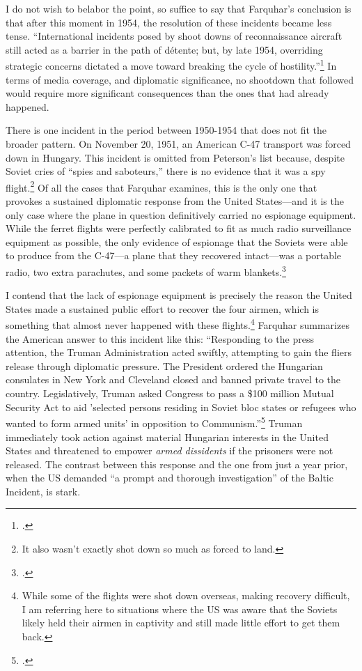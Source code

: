 \documentclass{report}
\begin{document}
\begin{refsegment}
I do not wish to belabor the point, so suffice to say that Farquhar's conclusion is that after this moment in 1954, the resolution of these incidents became less tense. ``International incidents posed by shoot downs of reconnaissance aircraft still acted as a barrier in the path of d\'etente; but, by late 1954, overriding strategic concerns dictated a move toward breaking the cycle of hostility.''\footcite[p.~49]{farquhar_aerial_2015} In terms of media coverage, and diplomatic significance, no shootdown that followed would require more significant consequences than the ones that had already happened.


There is one incident in the period between 1950-1954 that does not fit the broader pattern. On November 20, 1951, an American C-47 transport was forced down in Hungary. This incident is omitted from Peterson's list because, despite Soviet cries of ``spies and saboteurs,'' there is no evidence that it was a spy flight.\footnote{It also wasn't exactly shot down so much as forced to land.} Of all the cases that Farquhar examines, this is the only one that provokes a sustained diplomatic response from the United States---and it is the only case where the plane in question definitively carried no espionage equipment. While the ferret flights were perfectly calibrated to fit as much radio surveillance equipment as possible, the only evidence of espionage that the Soviets were able to produce from the C-47---a plane that they recovered intact---was a portable radio, two extra parachutes, and some packets of warm blankets.\footcite{the_united_press_soviet_1951}

I contend that the lack of espionage equipment is precisely the reason the United States made a sustained public effort to recover the four airmen, which is something that almost never happened with these flights.\footnote{While some of the flights were shot down overseas, making recovery difficult, I am referring here to situations where the US was aware that the Soviets likely held their airmen in captivity and still made little effort to get them back.} Farquhar summarizes the American answer to this incident like this: ``Responding to the press attention, the Truman Administration acted swiftly, attempting to gain the fliers release through diplomatic pressure. The President ordered the Hungarian consulates in New York and Cleveland closed and banned private travel to the country. Legislatively, Truman asked Congress to pass a \$100 million Mutual Security Act to aid 'selected persons residing in Soviet bloc states or refugees who wanted to form armed units' in opposition to Communism.''\footcite[p.~43]{farquhar_aerial_2015} Truman immediately took action against material Hungarian interests in the United States and threatened to empower \emph{armed dissidents} if the prisoners were not released. The contrast between this response and the one from just a year prior, when the US demanded ``a prompt and thorough investigation'' of the Baltic Incident, is stark.


\end{refsegment}
\end{document}

